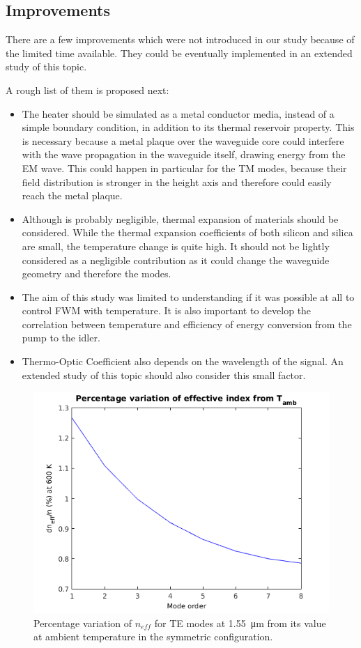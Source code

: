 \documentclass[12pt,a4paper,twoside]{article}
\begin{document}
\subsection{Improvements}

There are a few improvements which were not introduced in our study because of the limited time available.
They could be eventually implemented in an extended study of this topic.

A rough list of them is proposed next:
\begin{itemize}
\item	The heater should be simulated as a metal conductor media, instead of a simple boundary condition, in addition to its thermal reservoir property. This is necessary because a metal plaque over the waveguide core could interfere with the wave propagation in the waveguide itself, drawing energy from the EM wave. This could happen in particular for the TM modes, because their field distribution is stronger in the height axis and therefore could easily reach the metal plaque.

\item	Although is probably negligible, thermal expansion of materials should be considered.
While the thermal expansion coefficients of both silicon and silica are small, the temperature change is quite high.
It should not be lightly considered as a negligible contribution as it could change the waveguide geometry and therefore the modes.

\item	The aim of this study was limited to understanding if it was possible at all to control FWM with temperature.
It is also important to develop the correlation between temperature and efficiency of energy conversion from the pump to the idler.

\item	Thermo-Optic Coefficient also depends on the wavelength of the signal.
An extended study of this topic should also consider this small factor.
\end{itemize}

\begin{figure}[!ht]
	\centering
	\includegraphics[width=.75\textwidth]{variation.png}
	\caption{Percentage variation of $n_{eff}$ for TE modes at \SI{1.55}{\um} from its value at ambient temperature in the symmetric configuration.}
	\label{fig_variation}
\end{figure}
\end{document}
